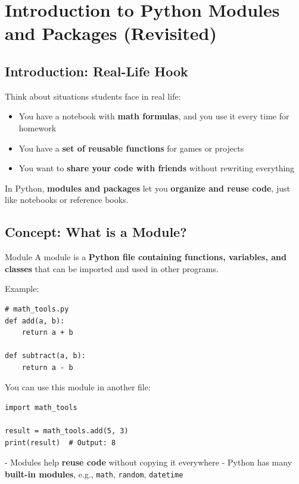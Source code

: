 \chapter{Introduction to Python Modules and Packages (Revisited)}

\section{Introduction: Real-Life Hook}

Think about situations students face in real life:

\begin{itemize}
    \item You have a notebook with \textbf{math formulas}, and you use it every time for homework  
    \item You have a \textbf{set of reusable functions} for games or projects  
    \item You want to \textbf{share your code with friends} without rewriting everything  
\end{itemize}

In Python, \textbf{modules and packages} let you \textbf{organize and reuse code}, just like notebooks or reference books.

\section{Concept: What is a Module?}

\begin{definition}{Module}
A module is a \textbf{Python file containing functions, variables, and classes} that can be imported and used in other programs.
\end{definition}

Example:

\begin{verbatim}
# math_tools.py
def add(a, b):
    return a + b

def subtract(a, b):
    return a - b
\end{verbatim}

You can use this module in another file:

\begin{verbatim}
import math_tools

result = math_tools.add(5, 3)
print(result)  # Output: 8
\end{verbatim}

- Modules help \textbf{reuse code} without copying it everywhere  
- Python has many \textbf{built-in modules}, e.g., \texttt{math}, \texttt{random}, \texttt{datetime}  

